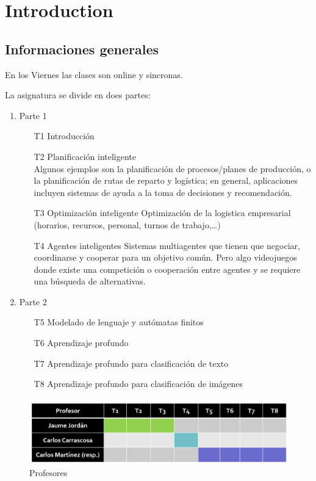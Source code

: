\chapter{Introduction}

\section{Informaciones generales}
En los Viernes las clases son online y sincronas.

La asignatura se divide en does partes:
\begin{enumerate}
   \item Parte 1
   \begin{enumerate}
      \item[T1] Introducción
      \item[T2] Planificación inteligente\\
      Algunos ejemplos son la planificación de procesos/planes de producción, o la planificación de rutas de reparto y logística;
en general, aplicaciones incluyen sistemas de ayuda a la toma de decisiones y recomendación.
      \item[T3] Optimización inteligente
      Optimización de la logistica empresarial (horarios, recursos, personal, turnos de trabajo,\dots)
      \item[T4] Agentes inteligentes
      Sistemas multiagentes que tienen que negociar, coordinarse y cooperar para un objetivo común. Pero algo videojuegos donde existe una competición o cooperación entre agentes y se requiere una búsqueda de alternativas.
   \end{enumerate}
   \item Parte 2
   \begin{enumerate}
      \item[T5] Modelado de lenguaje y autómatas finitos
      \item[T6] Aprendizaje profundo
      \item[T7] Aprendizaje profundo para clasificación de texto
      \item[T8] Aprendizaje profundo para clasificación de imágenes
   \end{enumerate}
\end{enumerate}

\begin{figure}[htbp]
   \centering
   \includegraphics{images/01/profesores.png}
   \caption{Profesores}
   \label{fig:01/profesores}
\end{figure}

